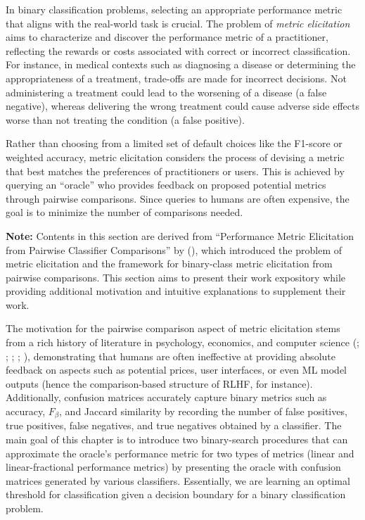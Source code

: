 \documentclass[
  letterpaper,
  numbers=noenddot,
  DIV=11]{scrreprt}
\theoremstyle{plain}
\theoremstyle{definition}
\theoremstyle{plain}
\theoremstyle{remark}
\begin{document}
In binary classification problems, selecting an appropriate performance
metric that aligns with the real-world task is crucial. The problem of
\emph{metric elicitation} aims to characterize and discover the
performance metric of a practitioner, reflecting the rewards or costs
associated with correct or incorrect classification. For instance, in
medical contexts such as diagnosing a disease or determining the
appropriateness of a treatment, trade-offs are made for incorrect
decisions. Not administering a treatment could lead to the worsening of
a disease (a false negative), whereas delivering the wrong treatment
could cause adverse side effects worse than not treating the condition
(a false positive).

Rather than choosing from a limited set of default choices like the
F1-score or weighted accuracy, metric elicitation considers the process
of devising a metric that best matches the preferences of practitioners
or users. This is achieved by querying an ``oracle'' who provides
feedback on proposed potential metrics through pairwise comparisons.
Since queries to humans are often expensive, the goal is to minimize the
number of comparisons needed.

\textbf{Note:} Contents in this section are derived from ``Performance
Metric Elicitation from Pairwise Classifier Comparisons'' by
(),
which introduced the problem of metric elicitation and the framework for
binary-class metric elicitation from pairwise comparisons. This section
aims to present their work expository while providing additional
motivation and intuitive explanations to supplement their work.

The motivation for the pairwise comparison aspect of metric elicitation
stems from a rich history of literature in psychology, economics, and
computer science (;
; ; ;
), demonstrating that
humans are often ineffective at providing absolute feedback on aspects
such as potential prices, user interfaces, or even ML model outputs
(hence the comparison-based structure of RLHF, for instance).
Additionally, confusion matrices accurately capture binary metrics such
as accuracy, \(F_\beta\), and Jaccard similarity by recording the number
of false positives, true positives, false negatives, and true negatives
obtained by a classifier. The main goal of this chapter is to introduce
two binary-search procedures that can approximate the oracle's
performance metric for two types of metrics (linear and
linear-fractional performance metrics) by presenting the oracle with
confusion matrices generated by various classifiers. Essentially, we are
learning an optimal threshold for classification given a decision
boundary for a binary classification problem.
\end{document}
